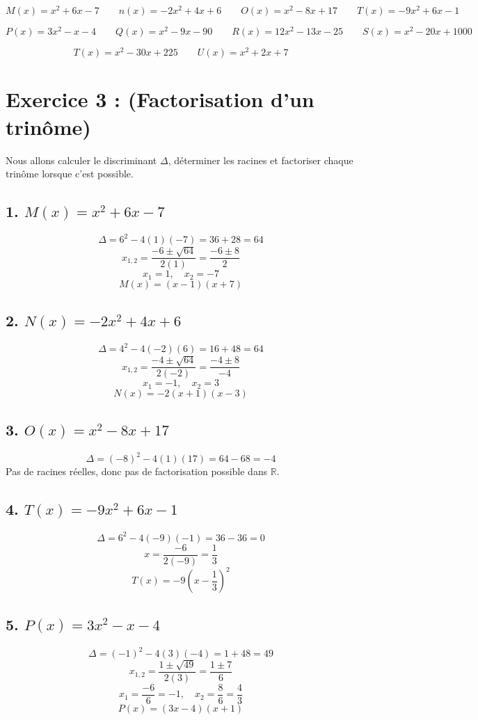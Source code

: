 \documentclass[12pt]{article}
\begin{document}
\[
M(x) = x^2 + 6x - 7 \quad\quad n(x) = -2x^2 + 4x + 6 \quad\quad O(x) = x^2 - 8x + 17 \quad\quad T(x) = -9x^2 + 6x - 1
\]

\[
P(x) = 3x^2 - x - 4 \quad\quad Q(x) = x^2 - 9x - 90 \quad\quad R(x) = 12x^2 - 13x - 25 \quad\quad S(x) = x^2 - 20x + 1000
\]

\[
T(x) = x^2 - 30x + 225 \quad\quad U(x) = x^2 + 2x + 7
\]

\section*{Exercice 3 : (Factorisation d’un trinôme)}

Nous allons calculer le discriminant \(\Delta\), déterminer les racines et factoriser chaque trinôme lorsque c'est possible.

\subsection*{1. \( M(x) = x^2 + 6x - 7 \)}
\[
\Delta = 6^2 - 4(1)(-7) = 36 + 28 = 64
\]
\[
x_{1,2} = \frac{-6 \pm \sqrt{64}}{2(1)} = \frac{-6 \pm 8}{2}
\]
\[
x_1 = 1, \quad x_2 = -7
\]
\[
M(x) = (x - 1)(x + 7)
\]

\subsection*{2. \( N(x) = -2x^2 + 4x + 6 \)}
\[
\Delta = 4^2 - 4(-2)(6) = 16 + 48 = 64
\]
\[
x_{1,2} = \frac{-4 \pm \sqrt{64}}{2(-2)} = \frac{-4 \pm 8}{-4}
\]
\[
x_1 = -1, \quad x_2 = 3
\]
\[
N(x) = -2(x + 1)(x - 3)
\]

\subsection*{3. \( O(x) = x^2 - 8x + 17 \)}
\[
\Delta = (-8)^2 - 4(1)(17) = 64 - 68 = -4
\]
Pas de racines réelles, donc pas de factorisation possible dans \(\mathbb{R}\).

\subsection*{4. \( T(x) = -9x^2 + 6x - 1 \)}
\[
\Delta = 6^2 - 4(-9)(-1) = 36 - 36 = 0
\]
\[
x = \frac{-6}{2(-9)} = \frac{1}{3}
\]
\[
T(x) = -9(x - \frac{1}{3})^2
\]

\subsection*{5. \( P(x) = 3x^2 - x - 4 \)}
\[
\Delta = (-1)^2 - 4(3)(-4) = 1 + 48 = 49
\]
\[
x_{1,2} = \frac{1 \pm \sqrt{49}}{2(3)} = \frac{1 \pm 7}{6}
\]
\[
x_1 = \frac{-6}{6} = -1, \quad x_2 = \frac{8}{6} = \frac{4}{3}
\]
\[
P(x) = (3x - 4)(x + 1)
\]
\end{document}
